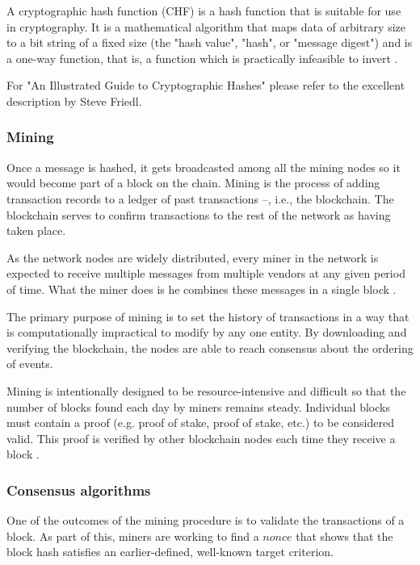 \documentclass[a4paper]{article}
\begin{document}
A cryptographic hash function (CHF) is a hash function that is suitable for use in cryptography. It is a mathematical algorithm that maps data of arbitrary size to a bit string of a fixed size (the "hash value", "hash", or "message digest") and is a one-way function, that is, a function which is practically infeasible to invert \cite{CHF}.

For "An Illustrated Guide to Cryptographic Hashes" please refer to the excellent description \cite{illustrative_CHF} by Steve Friedl.

\subsubsection{Mining}

Once a message is hashed, it gets broadcasted among all the mining nodes so it would become part of a block on the chain. Mining is the process of adding transaction records to a ledger of past transactions --, i.e., the blockchain. The blockchain serves to confirm transactions to the rest of the network as having taken place. 

As the network nodes are widely distributed, every miner in the network is expected to receive multiple messages from multiple vendors at any given period of time. What the miner does is he combines these messages in a single block \cite{tutorialspoint}.

The primary purpose of mining is to set the history of transactions in a way that is computationally impractical to modify by any one entity. By downloading and verifying the blockchain, the nodes are able to reach consensus about the ordering of events. 

Mining is intentionally designed to be resource-intensive and difficult so that the number of blocks found each day by miners remains steady. Individual blocks must contain a proof (e.g. proof of stake, proof of stake, etc.) to be considered valid. This proof is verified by other blockchain nodes each time they receive a block \cite{bitcoin_wiki}.

\subsubsection{Consensus algorithms}
One of the outcomes of the mining procedure is to validate the transactions of a block. As part of this, miners are working to find a $nonce$ that shows that the block hash satisfies an earlier-defined, well-known target criterion.
\end{document}
